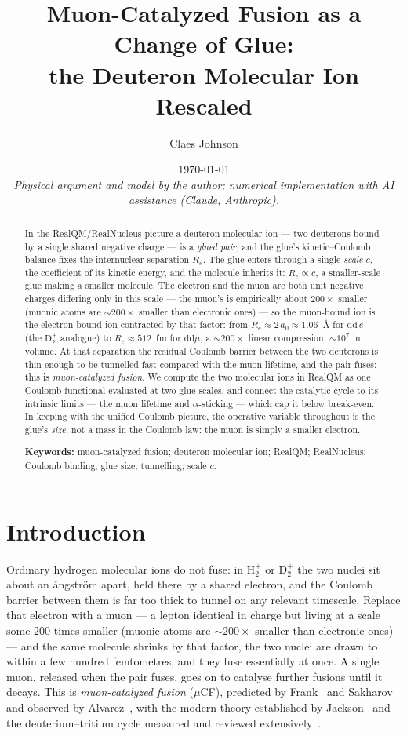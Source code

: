 \documentclass[11pt]{article}
\title{Muon-Catalyzed Fusion as a Change of Glue:\\
the Deuteron Molecular Ion Rescaled}
\author[1]{Claes Johnson}
\affil[1]{KTH Royal Institute of Technology, SE-100 44 Stockholm, Sweden \\
\texttt{claesjohnson@gmail.com}}
\date{\today \\[0.4em]
\small\textit{Physical argument and model by the author; numerical implementation with AI assistance (Claude, Anthropic).}}
\begin{document}
\maketitle

\begin{abstract}
In the RealQM/RealNucleus picture a deuteron molecular ion --- two deuterons bound by a single shared
negative charge --- is a \emph{glued pair}, and the glue's kinetic--Coulomb balance fixes the
internuclear separation $R_e$. The glue enters through a single \emph{scale} $c$, the coefficient of its
kinetic energy, and the molecule inherits it: $R_e\propto c$, a smaller-scale glue making a smaller
molecule. The electron and the muon are both unit negative charges differing only in this scale --- the
muon's is empirically about $200\times$ smaller (muonic atoms are $\sim\!200\times$ smaller than
electronic ones) --- so the muon-bound ion is the electron-bound ion contracted by that factor: from
$R_e\approx2\,a_0\approx1.06$~{\AA} for $\mathrm{dd}\,e$ (the $\mathrm{D}_2^{+}$ analogue) to
$R_e\approx512$~fm for $\mathrm{dd}\mu$, a $\sim\!200\times$ linear compression, $\sim\!10^{7}$ in
volume. At that separation the residual Coulomb barrier between the two deuterons is thin enough to be
tunnelled fast compared with the muon lifetime, and the pair fuses: this is \emph{muon-catalyzed
fusion}. We compute the two molecular ions in RealQM as one Coulomb functional evaluated at two glue
scales, and connect the catalytic cycle to its intrinsic limits --- the muon lifetime and
$\alpha$-sticking --- which cap it below break-even. In keeping with the unified Coulomb picture, the
operative variable throughout is the glue's \emph{size}, not a mass in the Coulomb law: the muon is
simply a smaller electron.

\medskip
\noindent\textbf{Keywords:} muon-catalyzed fusion; deuteron molecular ion; RealQM; RealNucleus; Coulomb
binding; glue size; tunnelling; scale $c$.
\end{abstract}


\section{Introduction}

Ordinary hydrogen molecular ions do not fuse: in $\mathrm{H}_2^{+}$ or $\mathrm{D}_2^{+}$ the two nuclei
sit about an {\aa}ngstr\"om apart, held there by a shared electron, and the Coulomb barrier between them
is far too thick to tunnel on any relevant timescale. Replace that electron with a muon --- a lepton
identical in charge but living at a scale some $200$ times smaller (muonic atoms are $\sim\!200\times$
smaller than electronic ones) --- and the same molecule shrinks by that factor, the two nuclei are drawn
to within a few hundred femtometres, and they fuse essentially at once. A single muon, released when the pair fuses, goes on to catalyse further fusions until it decays.
This is \emph{muon-catalyzed fusion} ($\mu$CF), predicted by Frank~\cite{Frank} and
Sakharov~\cite{Sakharov} and observed by Alvarez~\cite{Alvarez}, with the modern theory established by
Jackson~\cite{Jackson} and the deuterium--tritium cycle measured and reviewed
extensively~\cite{Jones,Breunlich}.
\end{document}
